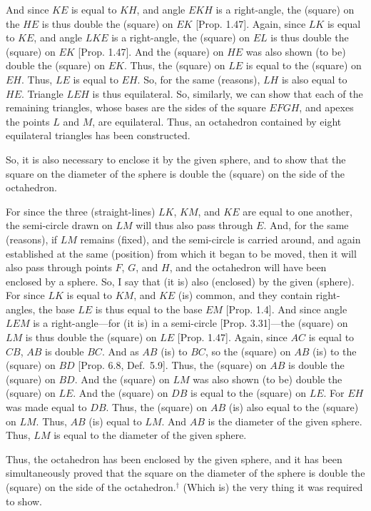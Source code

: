 \begin{Parallel}{}{}
{\epsfysize=3.25in
\centerline{}

And since  $KE$ is equal to $KH$, and angle $EKH$ is a right-angle, 
the (square) on the  $HE$ is thus double the (square) on $EK$ [Prop. 1.47].
Again, since $LK$ is equal to $KE$, and angle $LKE$
is a right-angle, the (square) on $EL$ is thus double the (square) on
$EK$ [Prop. 1.47]. And the (square) on $HE$ was also shown (to be)
double the (square) on $EK$.  Thus, the (square) on $LE$
is equal to the (square) on $EH$. Thus, $LE$ is equal to $EH$. So,
for the same (reasons), $LH$ is also equal to $HE$. Triangle
$LEH$ is thus equilateral. So, similarly, we can show that each of
the remaining triangles, whose bases are the sides of the
square $EFGH$, and apexes the points $L$ and $M$, are equilateral.
Thus, an octahedron contained by eight
equilateral triangles has been constructed.

So, it is also necessary to enclose it by the given sphere, and to show that the
square on the diameter of the sphere is double the (square) on the
side of the octahedron.

For since the three (straight-lines) $LK$, $KM$, and $KE$ are equal
to one another, the semi-circle drawn on $LM$ will thus also pass
through $E$. And, for the same (reasons), if $LM$ remains (fixed), and the semi-circle is carried around, and again established at the same
(position) from which it began to be moved, then it will also pass
through points $F$, $G$, and $H$, and the octahedron will have been
enclosed by a sphere. So, I say that (it is) also (enclosed)
by the given (sphere). For since $LK$ is equal to $KM$, and $KE$
(is) common, and they contain right-angles, the base
$LE$ is thus equal to the base $EM$ [Prop. 1.4]. And since angle $LEM$
is a right-angle---for (it is) in a semi-circle [Prop. 3.31]---the
(square) on $LM$ is thus double the (square) on $LE$ [Prop. 1.47]. 
Again, since $AC$ is equal to $CB$, $AB$ is double $BC$. 
And as $AB$ (is) to $BC$, so the (square) on $AB$ (is) to the
(square) on $BD$ [Prop. 6.8, Def.~5.9]. Thus, the (square) on 
$AB$ is double the (square) on $BD$. And the (square) on $LM$
was also shown (to be) double the (square) on $LE$. And the (square)
on $DB$ is equal to the (square) on $LE$. For $EH$ was made equal
to $DB$. Thus, the (square) on $AB$ (is) also equal to the (square) on 
$LM$. Thus, $AB$ (is) equal to $LM$. And $AB$ is the diameter of the
given sphere. Thus, $LM$ is equal to the diameter of the given sphere.

Thus, the octahedron has been enclosed by the given sphere,  and it has
been simultaneously  proved that the square on the diameter of the sphere
is double the (square) on the side of the octahedron.$^\dag$ (Which is) the
very thing it was required to show.}
\end{Parallel}


